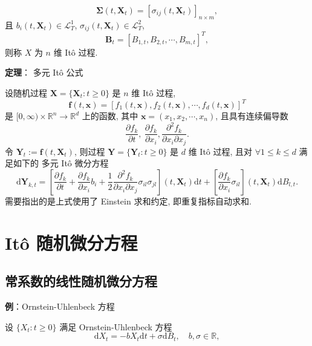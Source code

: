 \documentclass[openany]{ctexbook}
\theoremstyle{kaiti}
\theoremstyle{normal}
\begin{document}
\begin{equation}
  \bm{\Sigma}(t,\bm{X}_t)=[\sigma_{ij}(t,\bm{X}_t)]_{n\times m},
\end{equation}
且 $b_i(t,\bm{X}_t)\in\mathcal{L}_T^1$, $\sigma_{ij}(t,\bm{X}_t)\in\mathcal{L}_T^2$,
\begin{equation}
  \bm{B}_t=\left[B_{1,t},B_{2,t},\cdots,B_{m,t}\right]^T,
\end{equation}
则称 $X$ 为 $n$ 维 It\^o 过程.

\textbf{定理}： 多元 It\^o 公式

设随机过程 $\bm{X}=\{\bm{X}_t:t\geqslant0\}$ 是 $n$ 维 It\^o 过程,
\begin{equation}
  \bm{f}(t,\bm{x})=[f_1(t,\bm{x}),f_2(t,\bm{x}),\cdots,f_d(t,\bm{x})]^T
\end{equation}
是 $[0,\infty)\times\mathbb{R}^n\to\mathbb{R}^d$ 上的函数, 其中 $\bm{x}=(x_1,x_2,\cdots,x_n)$, 且具有连续偏导数
\begin{equation}
  \frac{\partial f_k}{\partial t},~\frac{\partial f_k}{\partial x_i},\frac{\partial^2 f_k}{\partial x_i\partial x_j}.
\end{equation}
令 $\bm{Y}_t:= \bm{f}(t,\bm{X}_t)$, 则过程 $\bm{Y}=\{\bm{Y}_t:t\geqslant0\}$ 是 $d$ 维 It\^o 过程, 且对 $\forall 1\leqslant k\leqslant d$ 满足如下的 多元 It\^o 微分方程
\begin{equation}
  \mathrm{d}\bm{Y}_{k,t}=\left[\frac{\partial f_k}{\partial t}+\frac{\partial f_k}{\partial x_i}b_i+\frac{1}{2}\frac{\partial^2 f_k}{\partial x_i\partial x_j}\sigma_{il}\sigma_{jl}\right](t,\bm{X}_t)\mathrm{d}t+\left[\frac{\partial f_k}{\partial x_i}\sigma_{il}\right](t,\bm{X}_t)\mathrm{d}B_{l,t}.
\end{equation}
需要指出的是上式使用了 Einstein 求和约定, 即重复指标自动求和.

\section{It\^o 随机微分方程}

\subsection{常系数的线性随机微分方程}

\textbf{例}：Ornstein-Uhlenbeck 方程

设 $\{X_t:t\geqslant0\}$ 满足 Ornstein-Uhlenbeck 方程
\begin{equation}
  \mathrm{d}X_t=-b X_t\mathrm{d}t+\sigma\mathrm{d}B_t,\quad b,\sigma\in\mathbb{R},
\end{equation}
\end{document}
